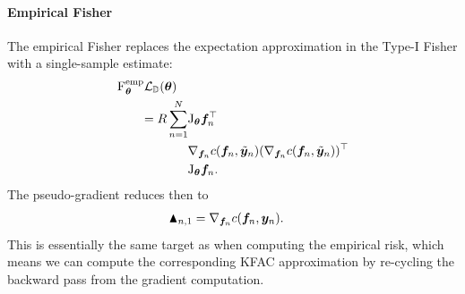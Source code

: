 \paragraph{Empirical Fisher}
The empirical Fisher replaces the expectation approximation in the Type-I Fisher with a single-sample estimate:
\begin{align*}
  \mathrm{F}_{\bm{\theta}}^{\text{emp}} &{\mathcal{L}}_{{\mathbb{D}}}({\bm{\theta}}) \\
  &\begin{aligned}= R \sum_{n=1}^N
      &\mathrm{J}_{{\bm{\theta}}} {\bm{f}}_n^{\top} \\
      & \nabla_{{\bm{f}}_n} c({\bm{f}}_n, \tilde{{\bm{y}}}_{n}) (\nabla_{{\bm{f}}_n} c({\bm{f}}_n, \tilde{{\bm{y}}}_n ))^{\top} \\
      &\mathrm{J}_{{\bm{\theta}}} {\bm{f}}_n.
  \end{aligned}
\end{align*}
The pseudo-gradient reduces then to
\begin{align*}
  \blacktriangle_{n,1}
  &= \nabla_{{\bm{f}}_n}  c({\bm{f}}_n, {\bm{y}}_n).
\end{align*}
This is essentially the same target as when computing the empirical risk, which means we can compute the corresponding KFAC approximation by re-cycling the backward pass from the gradient computation.

